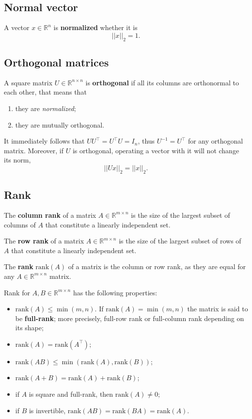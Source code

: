 \documentclass[10pt]{report}
\begin{document}
\subsection{Normal vector}
\label{sec:orge2edfe5}
A vector \(x \in \mathbb{R}^n\) is \textbf{normalized} whether it is $$||x||_2 = 1.$$
\subsection{Orthogonal matrices}
\label{sec:org314d257}
A square matrix \(U \in \mathbb{R}^{n \times n}\) is \textbf{orthogonal} if all its columns are orthonormal to each other, that means that
\begin{enumerate}
\item they are \emph{normalized};
\item they are mutually orthogonal.
\end{enumerate}

It immediately follows that \(UU^\top = U^\top U = I_n\), thus \(U^{-1} = U^\top\) for any orthogonal matrix. Moreover, if \(U\) is orthogonal, operating a vector with it will not change its norm, $$||Ux||_2 = ||x||_2.$$
\subsection{Rank}
\label{sec:org2ba6f94}
The \textbf{column rank} of a matrix \(A \in \mathbb{R}^{m \times n}\) is the size of the largest subset of columns of  \(A\) that constitute a linearly independent set.

The \textbf{row rank} of a matrix \(A \in \mathbb{R}^{m \times n}\) is the size of the largest subset of rows of  \(A\) that constitute a linearly independent set.

The \textbf{rank} \(\mbox{rank}(A)\) of a matrix is the column or row rank, as they are equal for any \(A \in \mathbb{R}^{m \times n}\) matrix.

Rank for \(A,B \in \mathbb{R}^{m \times n}\) has the following properties:
\begin{itemize}
\item \(\mbox{rank}(A) \leq \min(m, n)\). If \(\mbox{rank}(A) = \min(m, n)\) the matrix is said to be \textbf{full\--rank}; more precisely, full\--row rank or full\--column rank depending on its shape;
\item \(\mbox{rank}(A) = \mbox{rank}(A^\top)\);
\item \(\mbox{rank}(AB) \leq \min{(\mbox{rank}(A),\mbox{rank}(B))}\);
\item \(\mbox{rank}(A + B) = \mbox{rank}(A) + \mbox{rank}(B)\);
\item if \(A\) is square and full\--rank, then \(\mbox{rank}(A) \neq 0\);
\item if \(B\) is invertible, \(\mbox{rank}(AB) = \mbox{rank}(BA) = \mbox{rank}(A)\).
\end{itemize}
\end{document}
